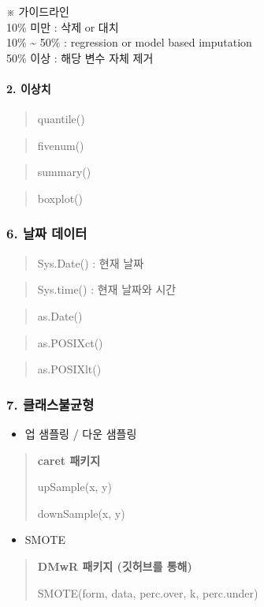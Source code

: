 \documentclass[
]{article}
\providecommand{\tightlist}{%
  \setlength{\itemsep}{0pt}\setlength{\parskip}{0pt}}
\begin{document}
※ 가이드라인\\
10\% 미만 : 삭제 or 대치\\
10\% \textasciitilde{} 50\% : regression or model based imputation\\
50\% 이상 : 해당 변수 자체 제거

\hypertarget{uxc774uxc0c1uxce58}{%
\paragraph{2. 이상치}\label{uxc774uxc0c1uxce58}}

\begin{quote}
quantile()
\end{quote}

\begin{quote}
fivenum()
\end{quote}

\begin{quote}
summary()
\end{quote}

\begin{quote}
boxplot()
\end{quote}

\hypertarget{uxb0a0uxc9dc-uxb370uxc774uxd130}{%
\subsubsection{6. 날짜 데이터}\label{uxb0a0uxc9dc-uxb370uxc774uxd130}}

\begin{quote}
Sys.Date() : 현재 날짜
\end{quote}

\begin{quote}
Sys.time() : 현재 날짜와 시간
\end{quote}

\begin{quote}
as.Date()
\end{quote}

\begin{quote}
as.POSIXct()
\end{quote}

\begin{quote}
as.POSIXlt()
\end{quote}

\hypertarget{uxd074uxb798uxc2a4uxbd88uxade0uxd615}{%
\subsubsection{7.
클래스불균형}\label{uxd074uxb798uxc2a4uxbd88uxade0uxd615}}

\begin{itemize}
\tightlist
\item
  업 샘플링 / 다운 샘플링
\end{itemize}

\begin{quote}
\textbf{caret 패키지}

upSample(x, y)

downSample(x, y)
\end{quote}

\begin{itemize}
\tightlist
\item
  SMOTE
\end{itemize}

\begin{quote}
\textbf{DMwR 패키지 (깃허브를 통해)}

SMOTE(form, data, perc.over, k, perc.under)
\end{quote}
\end{document}
